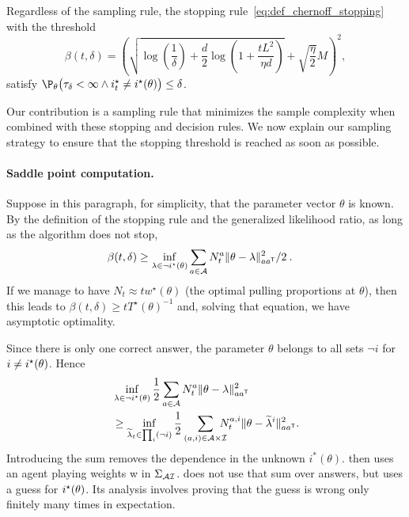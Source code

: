 \begin{lemma}
\label{lem:chernoff_stopping rule_pac}
Regardless of the sampling rule, the stopping rule~\eqref{eq:def_chernoff_stopping} with the threshold
{\small\begin{equation} \label{eq:def_beta}
\beta(t,\delta) =\left( \sqrt{\log\!\left( \frac{1}{\delta}\right)+\frac{d}{2}\log\!\left(1+\frac{t L^2}{\eta d} \right)} +\sqrt{\frac{\eta}{2}}M\right)^2\!\!\!,
\end{equation}}
satisfy $ \P_{\theta}\big(\tau_{\delta} < \infty \wedge \istar_t \neq \istar(\theta)\big) \leq \delta$.
\end{lemma}
Our contribution is a sampling rule that minimizes the sample complexity when combined with these stopping and decision rules.
We now explain our sampling strategy to ensure that the stopping threshold is reached as soon as possible.

\paragraph{Saddle point computation.}
Suppose in this paragraph, for simplicity, that the parameter vector $\theta$ is known. By the definition of the stopping rule and the generalized likelihood ratio, as long as the algorithm does not stop,
\begin{align*}
\beta(t,\delta)
&\ge \inf_{\lambda\in \neg i^\star(\theta)} \sum_{a\in \mathcal{A}} N_t^a \Vert \theta - \lambda \Vert^2_{a a^{\mathsf{\scriptscriptstyle T}}}/2 \: .
\end{align*}
If we manage to have $N_t \approx t w^\star(\theta)$ (the optimal pulling proportions at $\theta$), then this leads to $\beta(t,\delta) \ge t T^\star(\theta)^{-1}$ and, solving that equation, we have asymptotic optimality.

Since there is only one correct answer, the parameter $\theta$ belongs to all sets $\neg i$ for $i\neq i^\star(\theta)$. Hence
\begin{align*}
&\inf_{\lambda\in \neg i^\star(\theta)}\frac{1}{2} \sum_{a\in \mathcal{A}} N_t^a \Vert \theta - \lambda \Vert^2_{a a^{\mathsf{\scriptscriptstyle T}}}
\\&\geq \inf_{\widetilde{\lambda}_t\in \prod_i (\neg i)}\frac{1}{2}\sum_{(a,i)\in \mathcal{A}\times\mathcal{I}}\!\!\!\!\! N_t^{a,i} \Vert \theta - \widetilde{\lambda}^i \Vert^2_{a a^{\mathsf{\scriptscriptstyle T}}}.
\end{align*} Introducing the sum removes the dependence in the unknown $i^*(\theta)$. \LGC then uses an agent playing weights w in $\Sigma_{\mathcal{A}\mathcal{I}}$. \LG does not use that sum over answers, but uses a guess for $i^\star(\theta)$. Its analysis involves proving that the guess is wrong only finitely many times in expectation.


